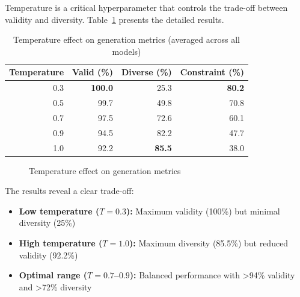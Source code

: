 \documentclass[11pt,a4paper]{article}
\begin{document}
Temperature is a critical hyperparameter that controls the trade-off between validity and diversity. Table~\ref{tab:temperature} presents the detailed results.

\begin{table}[H]
\centering
\caption{Temperature effect on generation metrics (averaged across all models)}
\label{tab:temperature}
\begin{tabular}{rrrr}
\toprule
\textbf{Temperature} & \textbf{Valid (\%)} & \textbf{Diverse (\%)} & \textbf{Constraint (\%)} \\
\midrule
0.3 & \textbf{100.0} & 25.3 & \textbf{80.2} \\
0.5 & 99.7 & 49.8 & 70.8 \\
0.7 & 97.5 & 72.6 & 60.1 \\
0.9 & 94.5 & 82.2 & 47.7 \\
1.0 & 92.2 & \textbf{85.5} & 38.0 \\
\bottomrule
\end{tabular}
\end{table}

\begin{figure}[H]
\centering
{}
\caption{Temperature effect on generation metrics}
\label{fig:temperature}
\end{figure}

The results reveal a clear trade-off:
\begin{itemize}
    \item \textbf{Low temperature ($T=0.3$):} Maximum validity (100\%) but minimal diversity (25\%)
    \item \textbf{High temperature ($T=1.0$):} Maximum diversity (85.5\%) but reduced validity (92.2\%)
    \item \textbf{Optimal range ($T=0.7$--$0.9$):} Balanced performance with >94\% validity and >72\% diversity
\end{itemize}
\end{document}
